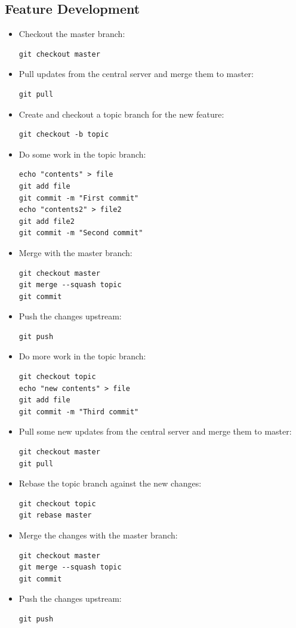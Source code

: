\documentclass[a4paper,10pt]{article}
\begin{document}
\subsection{Feature Development}
\begin{itemize}
  \item Checkout the master branch:
    \begin{lstlisting}
git checkout master
    \end{lstlisting}
  \item Pull updates from the central server and merge them to master:
    \begin{lstlisting}
git pull
    \end{lstlisting}
  \item Create and checkout a topic branch for the new feature:
    \begin{lstlisting}
git checkout -b topic
    \end{lstlisting}
  \item Do some work in the topic branch:
    \begin{lstlisting}
echo "contents" > file
git add file
git commit -m "First commit"
echo "contents2" > file2
git add file2
git commit -m "Second commit"
    \end{lstlisting}
  \item Merge with the master branch:
    \begin{lstlisting}
git checkout master
git merge --squash topic
git commit
    \end{lstlisting}
  \item Push the changes upstream:
    \begin{lstlisting}
git push
    \end{lstlisting}
  \item Do more work in the topic branch:
    \begin{lstlisting}
git checkout topic
echo "new contents" > file
git add file
git commit -m "Third commit"
    \end{lstlisting}
  \item Pull some new updates from the central server and merge them to master:
    \begin{lstlisting}
git checkout master
git pull
    \end{lstlisting}
  \item Rebase the topic branch against the new changes:
    \begin{lstlisting}
git checkout topic
git rebase master
    \end{lstlisting}
  \item Merge the changes with the master branch:
    \begin{lstlisting}
git checkout master
git merge --squash topic
git commit
    \end{lstlisting}
  \item Push the changes upstream:
    \begin{lstlisting}
git push
    \end{lstlisting}
\end{itemize}
\end{document}
